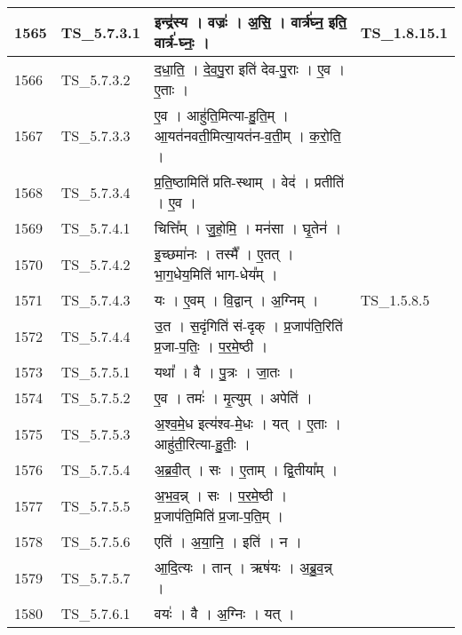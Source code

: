 \documentclass[17pt]{extarticle}
\begin{document}
\begin{longtable}{||p{0.4in}||p{0.9in}||p{4.0in}||p{0.9in}||}
        \hline
            1565 & TS\_5.7.3.1 & इन्द्र॑स्य   ।   वज्रः॑   ।   अ॒सि॒   ।   वार्त्र॑घ्न॒ इति॒ वार्त्र॑{-}घ्नः॒   ।    & TS\_1.8.15.1        \\
        \hline
            1566 & TS\_5.7.3.2 & द॒धा॒ति॒   ।   दे॒व॒पु॒रा इति॑ देव{-}पु॒राः   ।   ए॒व   ।   ए॒ताः   ।    &      \\
        \hline
            1567 & TS\_5.7.3.3 & ए॒व   ।   आहु॑ति॒मित्या{-}हु॒ति॒म्   ।   आ॒यत॑नवती॒मित्या॒यत॑न{-}व॒ती॒म्   ।   क॒रो॒ति॒   ।    &      \\
        \hline
            1568 & TS\_5.7.3.4 & प्र॒ति॒ष्ठामिति॑ प्रति{-}स्थाम्   ।   वेद॑   ।   प्रतीति॑   ।   ए॒व   ।    &      \\
        \hline
            1569 & TS\_5.7.4.1 & चित्ति᳚म्   ।   जु॒हो॒मि॒   ।   मन॑सा   ।   घृ॒तेन॑   ।    &      \\
        \hline
            1570 & TS\_5.7.4.2 & इ॒च्छमा॑नः   ।   तस्मै᳚   ।   ए॒तत्   ।   भा॒ग॒धेय॒मिति॑ भाग{-}धेय᳚म्   ।    &      \\
        \hline
            1571 & TS\_5.7.4.3 & यः   ।   ए॒वम्   ।   वि॒द्वान्   ।   अ॒ग्निम्   ।    & TS\_1.5.8.5        \\
        \hline
            1572 & TS\_5.7.4.4 & उ॒त   ।   स॒दृंगिति॑ सं{-}दृक्   ।   प्र॒जाप॑ति॒रिति॑ प्र॒जा{-}प॒तिः॒   ।   प॒र॒मे॒ष्ठी   ।    &      \\
        \hline
            1573 & TS\_5.7.5.1 & यथा᳚   ।   वै   ।   पु॒त्रः   ।   जा॒तः   ।    &      \\
        \hline
            1574 & TS\_5.7.5.2 & ए॒व   ।   तमः॑   ।   मृ॒त्युम्   ।   अपेति॑   ।    &      \\
        \hline
            1575 & TS\_5.7.5.3 & अ॒श्व॒मे॒ध इत्य॑श्व{-}मे॒धः   ।   यत्   ।   ए॒ताः   ।   आहु॑ती॒रित्या{-}हु॒तीः॒   ।    &      \\
        \hline
            1576 & TS\_5.7.5.4 & अ॒ब्र॒वी॒त्   ।   सः   ।   ए॒ताम्   ।   द्वि॒तीया᳚म्   ।    &      \\
        \hline
            1577 & TS\_5.7.5.5 & अ॒भ॒व॒न्न्   ।   सः   ।   प॒र॒मे॒ष्ठी   ।   प्र॒जाप॑ति॒मिति॑ प्र॒जा{-}प॒ति॒म्   ।    &      \\
        \hline
            1578 & TS\_5.7.5.6 & एति॑   ।   अ॒या॒नि॒   ।   इति॑   ।   न   ।    &      \\
        \hline
            1579 & TS\_5.7.5.7 & आ॒दि॒त्यः   ।   तान्   ।   ऋष॑यः   ।   अ॒ब्रु॒व॒न्न्   ।    &      \\
        \hline
            1580 & TS\_5.7.6.1 & वयः॑   ।   वै   ।   अ॒ग्निः   ।   यत्   ।    &      \\

\end{longtable}
\end{document}
